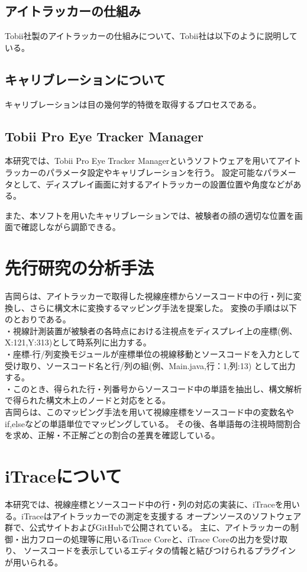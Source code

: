 \documentclass[paper=a4paper,fontsize=11pt]{jlreq}
\begin{document}
    \subsection{アイトラッカーの仕組み}
    Tobii社製のアイトラッカーの仕組みについて、Tobii社は以下のように説明している\cite{itracking_sikumi}。

    \subsection{キャリブレーションについて}
      キャリブレーションは目の幾何学的特徴を取得するプロセスである。
    \clearpage

    \subsection{Tobii Pro Eye Tracker Manager}
      本研究では、Tobii Pro Eye Tracker Manager\cite{manager}というソフトウェアを用いてアイトラッカーのパラメータ設定やキャリブレーションを行う。
      設定可能なパラメータとして、ディスプレイ画面に対するアイトラッカーの設置位置や角度などがある。

      また、本ソフトを用いたキャリブレーションでは、被験者の顔の適切な位置を画面で確認しながら調節できる。

  \section{先行研究の分析手法}
    吉岡らは、アイトラッカーで取得した視線座標からソースコード中の行・列に変換し、さらに構文木に変換するマッピング手法を提案した\cite{meiji2021}。
    変換の手順は以下のとおりである。\\
    ・視線計測装置が被験者の各時点における注視点をディスプレイ上の座標(例、X:121,Y:313)として時系列に出力する。\\
    ・座標-行/列変換モジュールが座標単位の視線移動とソースコードを入力として受け取り、ソースコード名と行/列の組(例、Main.java,行：1,列:13)
    として出力する。\\
    ・このとき、得られた行・列番号からソースコード中の単語を抽出し、構文解析で得られた構文木上のノードと対応をとる。\\
    
    吉岡らは、このマッピング手法を用いて視線座標をソースコード中の変数名やif,elseなどの単語単位でマッピングしている。
    その後、各単語毎の注視時間割合を求め、正解・不正解ごとの割合の差異を確認している。
  \clearpage    

  \section{iTraceについて}
    本研究では、視線座標とソースコード中の行・列の対応の実装に、iTrace\cite{itrace}を用いる。iTraceはアイトラッカーでの測定を支援する
    オープンソースのソフトウェア群で、公式サイトおよびGitHubで公開されている。
    主に、アイトラッカーの制御・出力フローの処理等に用いるiTrace Coreと、iTrace Coreの出力を受け取り、
    ソースコードを表示しているエディタの情報と結びつけられるプラグインが用いられる。
\end{document}
